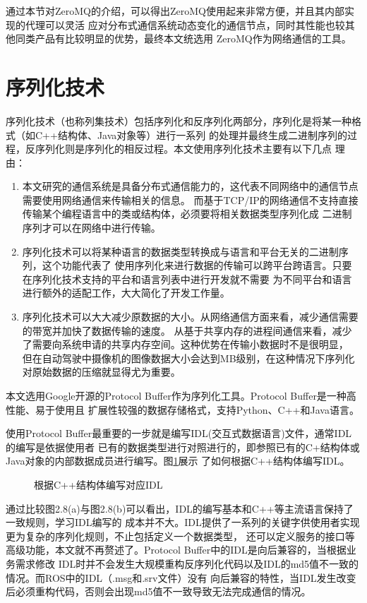 通过本节对ZeroMQ的介绍，可以得出ZeroMQ使用起来非常方便，并且其内部实现的代理可以灵活
应对分布式通信系统动态变化的通信节点，同时其性能也较其他同类产品有比较明显的优势，最终本文统选用
ZeroMQ作为网络通信的工具。

\section{序列化技术}
序列化技术（也称列集技术）包括序列化和反序列化两部分，序列化是将某一种格式（如C++结构体、Java对象等）进行一系列
的处理并最终生成二进制序列的过程，反序列化则是序列化的相反过程\cite{zj,wangbinbin}。本文使用序列化技术主要有以下几点
理由：
\begin{enumerate}
  \item 本文研究的通信系统是具备分布式通信能力的，这代表不同网络中的通信节点需要使用网络通信来传输相关的信息。
  而基于TCP/IP的网络通信不支持直接传输某个编程语言中的类或结构体，必须要将相关数据类型序列化成
  二进制序列才可以在网络中进行传输。
  \item 序列化技术可以将某种语言的数据类型转换成与语言和平台无关的二进制序列，这个功能代表了
  使用序列化来进行数据的传输可以跨平台跨语言。只要在序列化技术支持的平台和语言列表中进行开发就不需要
  为不同平台和语言进行额外的适配工作，大大简化了开发工作量。
  \item 序列化技术可以大大减少原数据的大小。从网络通信方面来看，减少通信需要的带宽并加快了数据传输的速度。
  从基于共享内存的进程间通信来看，减少了需要向系统申请的共享内存空间。这种优势在传输小数据时不是很明显，
  但在自动驾驶中摄像机的图像数据大小会达到MB级别，在这种情况下序列化对原始数据的压缩就显得尤为重要。
\end{enumerate}
本文选用Google开源的Protocol Buffer作为序列化工具。Protocol Buffer是一种高性能、易于使用且
扩展性较强的数据存储格式，支持Python、C++和Java语言\cite{sxy}。

使用Protocol Buffer最重要的一步就是编写IDL(交互式数据语言)文件，通常IDL的编写是依据使用者
已有的数据类型进行对照进行的，即参照已有的C+结构体或Java对象的内部数据成员进行编写。图\ref{IDL_compare}展示
了如何根据C++结构体编写IDL。
\begin{figure}[H]
  \centering
  \caption{根据C++结构体编写对应IDL}
  \label{IDL_compare}
\end{figure}
通过比较图2.8(a)与图2.8(b)可以看出，IDL的编写基本和C++等主流语言保持了一致规则，学习IDL编写的
成本并不大。IDL提供了一系列的关键字供使用者实现更为复杂的序列化规则，不止包括定义一个数据类型，
还可以定义服务的接口等高级功能，本文就不再赘述了。Protocol Buffer中的IDL是向后兼容的，当根据业务需求修改
IDL时并不会发生大规模重构反序列化代码以及IDL的md5值不一致的情况。而ROS中的IDL（.msg和.srv文件）没有
向后兼容的特性，当IDL发生改变后必须重构代码，否则会出现md5值不一致导致无法完成通信的情况。

